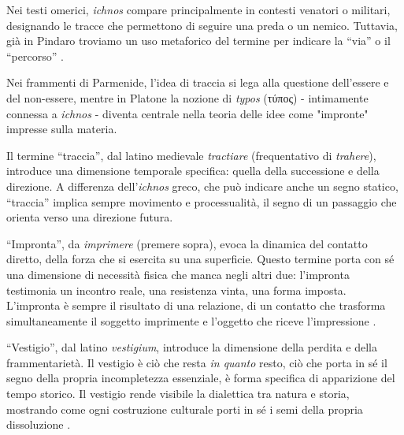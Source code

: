 Nei testi omerici, \textit{ichnos} compare principalmente in contesti venatori o militari, designando le tracce che permettono di seguire una preda o un nemico. Tuttavia, già in Pindaro troviamo un uso metaforico del termine per indicare la “via” o il “percorso” \cite{pindar1997}.

Nei frammenti di Parmenide, l'idea di traccia si lega alla questione dell'essere e del non-essere, mentre in Platone la nozione di \textit{typos} (τύπος) - intimamente connessa a \textit{ichnos} - diventa centrale nella teoria delle idee come "impronte" impresse sulla materia.

Il termine “traccia”, dal latino medievale \textit{tractiare} (frequentativo di \textit{trahere}), introduce una dimensione temporale specifica: quella della successione e della direzione. A differenza dell'\textit{ichnos} greco, che può indicare anche un segno statico, “traccia” implica sempre movimento e processualità, il segno di un passaggio che orienta verso una direzione futura.


“Impronta”, da \textit{imprimere} (premere sopra), evoca la dinamica del contatto diretto, della forza che si esercita su una superficie. Questo termine porta con sé una dimensione di necessità fisica che manca negli altri due: l'impronta testimonia un incontro reale, una resistenza vinta, una forma imposta. L'impronta è sempre il risultato di una relazione, di un contatto che trasforma simultaneamente il soggetto imprimente e l'oggetto che riceve l'impressione \cite{merleau-ponty1945}.

“Vestigio”, dal latino \textit{vestigium}, introduce la dimensione della perdita e della frammentarietà. Il vestigio è ciò che resta \textit{in quanto} resto, ciò che porta in sé il segno della propria incompletezza essenziale, è forma specifica di apparizione del tempo storico. Il vestigio rende visibile la dialettica tra natura e storia, mostrando come ogni costruzione culturale porti in sé i semi della propria dissoluzione \cite{benjamin1928}.


